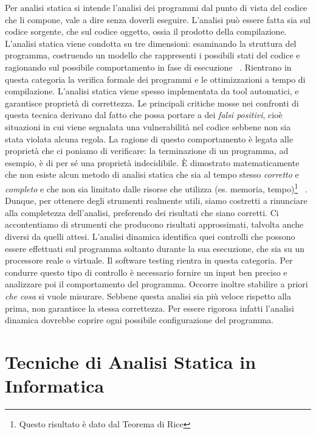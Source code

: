 Per analisi statica si intende l'analisi dei programmi dal punto di vista del codice che li compone, vale a dire senza doverli eseguire. L'analisi può essere fatta sia sul codice sorgente, che sul codice oggetto, ossia  il prodotto della compilazione.\newline
\indent L'analisi statica viene condotta su tre dimensioni: esaminando la struttura del programma, costruendo un modello che rappresenti i possibili stati del codice e ragionando sul possibile comportamento in fase di esecuzione ~\cite{ernst-ijcai97}. 
Rientrano in questa categoria la verifica formale dei programmi e le ottimizzazioni a tempo di compilazione. L'analisi statica viene spesso implementata da tool automatici, e garantisce proprietà di correttezza. Le principali critiche mosse nei confronti di questa tecnica derivano dal fatto che possa portare a dei \textit{falsi positivi}, cioè situazioni in cui viene segnalata una vulnerabilità nel codice sebbene non sia stata violata alcuna regola.
La ragione di questo comportamento è legata alle proprietà che ci poniamo di verificare: la terminazione di un programma, ad esempio, è di per sé una proprietà indecidibile. \`E dimostrato matematicamente che non esiste alcun metodo di analisi statica che sia al tempo stesso \emph{corretto} e \emph{completo} e che non sia limitato dalle risorse che utilizza (es. memoria, tempo)\footnote{Questo risultato è dato dal Teorema di Rice} ~\cite{ausiello2003linguaggi}. Dunque, per ottenere degli strumenti realmente utili, siamo costretti a rinunciare alla completezza dell'analisi, preferendo dei risultati che siano corretti. Ci accontentiamo di strumenti che producono risultati approssimati, talvolta anche diversi da quelli attesi.\newline
\indent L'analisi dinamica identifica quei controlli che possono essere effettuati sul programma soltanto durante la sua esecuzione, che sia su un processore reale o virtuale. Il software testing rientra in questa categoria. Per condurre questo tipo di controllo è necessario fornire un input ben preciso e analizzare poi il comportamento del programma. Occorre inoltre stabilire a priori \emph{che cosa} si vuole misurare. Sebbene questa analisi sia più veloce rispetto alla prima, non garantisce la stessa correttezza. Per essere rigorosa infatti l'analisi dinamica dovrebbe coprire ogni possibile configurazione del programma.\\


\section{Tecniche di Analisi Statica in Informatica}

